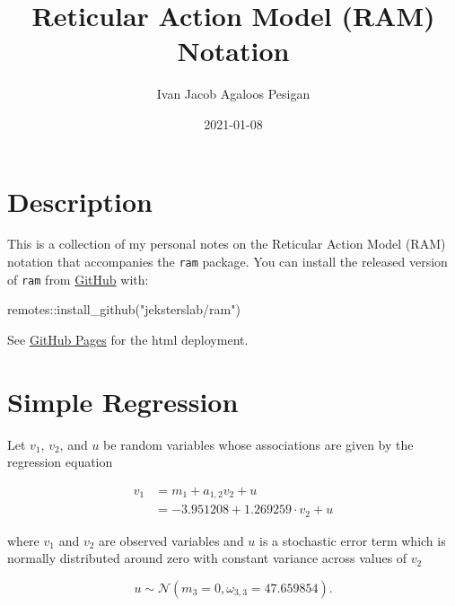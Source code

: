 \documentclass[
]{book}
\title{Reticular Action Model (RAM) Notation}
\author{Ivan Jacob Agaloos Pesigan}
\date{2021-01-08}
\newenvironment{Shaded}{\begin{snugshade}}{\end{snugshade}}
\newcommand{\FunctionTok}[1]{\textcolor[rgb]{0.00,0.00,0.00}{#1}}
\newcommand{\NormalTok}[1]{#1}
\newcommand{\SpecialCharTok}[1]{\textcolor[rgb]{0.00,0.00,0.00}{#1}}
\newcommand{\StringTok}[1]{\textcolor[rgb]{0.31,0.60,0.02}{#1}}
\begin{document}
\maketitle

{
\setcounter{tocdepth}{1}
\tableofcontents
}
\hypertarget{description}{%
\chapter{Description}\label{description}}

This is a collection of my personal notes on the Reticular Action Model (RAM) notation
that accompanies the \texttt{ram} package.
You can install the released version of \texttt{ram} from \href{https://github.com/jeksterslab/ram}{GitHub} with:

\begin{Shaded}
\begin{Highlighting}[]
\NormalTok{remotes}\SpecialCharTok{::}\FunctionTok{install\_github}\NormalTok{(}\StringTok{"jeksterslab/ram"}\NormalTok{)}
\end{Highlighting}
\end{Shaded}

See \href{https://jeksterslab.github.io/ram_notes/index.html}{GitHub Pages}
for the html deployment.

\hypertarget{simple-regression}{%
\chapter{Simple Regression}\label{simple-regression}}

Let \(v_1\), \(v_2\), and \(u\) be random variables whose associations are given by the regression equation

\begin{equation}
  \begin{split}
    v_1
    &=
    m_1 + a_{1, 2} v_2 + u \\
    &=
    -3.951208 + 1.269259 \cdot v_2 + u
  \end{split}
\end{equation}

\noindent where \(v_1\) and \(v_2\) are observed variables and
\(u\) is a stochastic error term which is normally distributed around zero
with constant variance across values of \(v_2\)

\begin{equation}
  u 
  \sim 
  \mathcal{N} \left( m_3 = 0, \omega_{3, 3} = 47.659854 \right) .
\end{equation}
\end{document}
